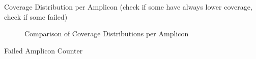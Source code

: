 Coverage Distribution per Amplicon (check if some have always lower coverage, check if some failed)
\begin{figure}[!tbp]
  \centering
  \hfill
  \caption{Comparison of Coverage Distributions per Amplicon}
\end{figure}




Failed Amplicon Counter

